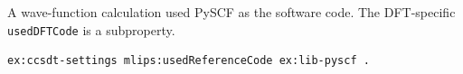 A wave-function calculation used PySCF as the software code. The DFT-specific \texttt{usedDFTCode} is a subproperty.
\begin{lstlisting}[language=turtle]
ex:ccsdt-settings mlips:usedReferenceCode ex:lib-pyscf .
\end{lstlisting}
